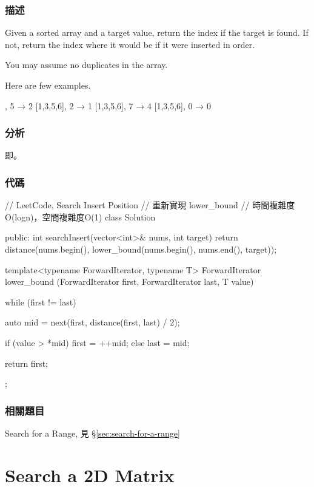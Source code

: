 \subsubsection{描述}
Given a sorted array and a target value, return the index if the target is found. If not, return the index where it would be if it were inserted in order.

You may assume no duplicates in the array.

Here are few examples.
\begin{Code}
[1,3,5,6], 5 → 2
[1,3,5,6], 2 → 1
[1,3,5,6], 7 → 4
[1,3,5,6], 0 → 0
\end{Code}


\subsubsection{分析}
即。


\subsubsection{代碼}
\begin{Code}
// LeetCode, Search Insert Position
// 重新實現 lower_bound
// 時間複雜度O(logn)，空間複雜度O(1)
class Solution {
public:
    int searchInsert(vector<int>& nums, int target) {
        return distance(nums.begin(), lower_bound(nums.begin(), nums.end(), target));
    }

    template<typename ForwardIterator, typename T>
    ForwardIterator lower_bound (ForwardIterator first,
            ForwardIterator last, T value) {
        while (first != last) {
            auto mid = next(first, distance(first, last) / 2);

            if (value > *mid)   first = ++mid;
            else                last = mid;
        }

        return first;
    }
};
\end{Code}


\subsubsection{相關題目}
\begindot
\item Search for a Range, 見 \S \ref{sec:search-for-a-range}
\myenddot


\section{Search a 2D Matrix} %
\label{sec:search-a-2d-matrix}


